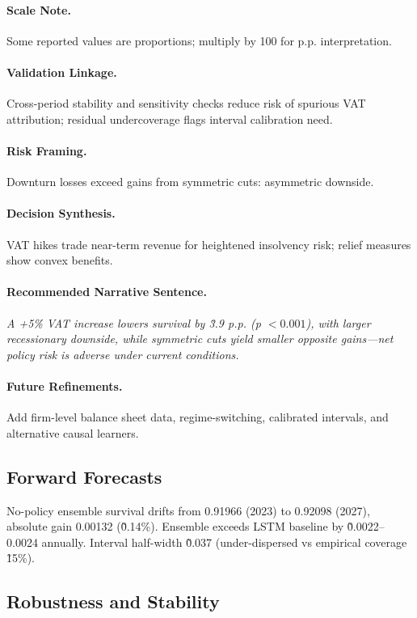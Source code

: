 \paragraph{Scale Note.} Some reported values are proportions; multiply by 100 for p.p. interpretation.

\paragraph{Validation Linkage.} Cross-period stability and sensitivity checks reduce risk of spurious VAT attribution; residual undercoverage flags interval calibration need.

\paragraph{Risk Framing.} Downturn losses exceed gains from symmetric cuts: asymmetric downside.

\paragraph{Decision Synthesis.} VAT hikes trade near-term revenue for heightened insolvency risk; relief measures show convex benefits.

\paragraph{Recommended Narrative Sentence.} \textit{A +5\% VAT increase lowers survival by \~3.9 p.p. (p $<0.001$), with larger recessionary downside, while symmetric cuts yield smaller opposite gains—net policy risk is adverse under current conditions.}

\paragraph{Future Refinements.} Add firm-level balance sheet data, regime-switching, calibrated intervals, and alternative causal learners.


\subsection{Forward Forecasts}
No-policy ensemble survival drifts from 0.91966 (2023) to 0.92098 (2027), absolute gain 0.00132 (\~0.14\%). Ensemble exceeds LSTM baseline by \~0.0022--0.0024 annually. Interval half-width \~0.037 (under-dispersed vs empirical coverage \~15\%).

\subsection{Robustness and Stability}
